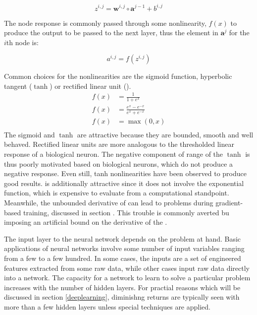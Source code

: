 \begin{equation}
z^{i,j} = \mathbf{w}^{i,j} \circ \mathbf{a}^{j-1} + b^{i,j}
\end{equation}

The node response is commonly passed through some nonlinearity, $f(x)$ to produce the output to be passed to the next layer, thus the element in $\mathbf{a}^{j}$ for the $i$th node is:

\begin{equation}
a^{i, j} = f(z^{i,j})
\end{equation}

Common choices for the nonlinearities are the sigmoid function, hyperbolic tangent ($\tanh$) or rectified linear unit (\relu).
\begin{align}
f(x) &= \frac{1}{1+e^x}  \tag{Sigmoid}\\
f(x) &= \frac{e^x-e^{-x}}{e^x+e^{-x}} \tag{$\tanh$} \\
f(x) &= \max(0,x) \tag{\relu}  \\
\end{align}
The sigmoid and $\tanh$ are attractive because they are bounded, smooth and well behaved.  Rectified linear units are more analogous to the thresholded linear response of a biological neuron.  The negative component of range of the $\tanh$ is thus poorly motivated based on biological neurons, which do not produce a negative response.  Even still, tanh nonlinearities have been observed to produce good results.  \relu is additionally attractive since it does not involve the exponential function, which is expensive to evaluate from a computational standpoint.  Meanwhile, the unbounded derivative of \relu can lead to problems during gradient-based training, discussed in section \label{backprop}.  This trouble is commonly averted bu imposing an artificial bound on the derivative of the \relu.

The input layer to the neural network depends on the problem at hand.  Basic applications of neural networks involve some number of input variables ranging from a few to a few hundred.  In some cases, the inputs are a set of engineered features extracted from some raw data, while other cases input raw data directly into a network.  The capacity for a network to learn to solve a particular problem increases with the number of hidden layers.  For practial reasons which will be discussed in section \ref{deeplearning}, diminishng returns are typically seen with more than a few hidden layers unless special techniques are applied.


